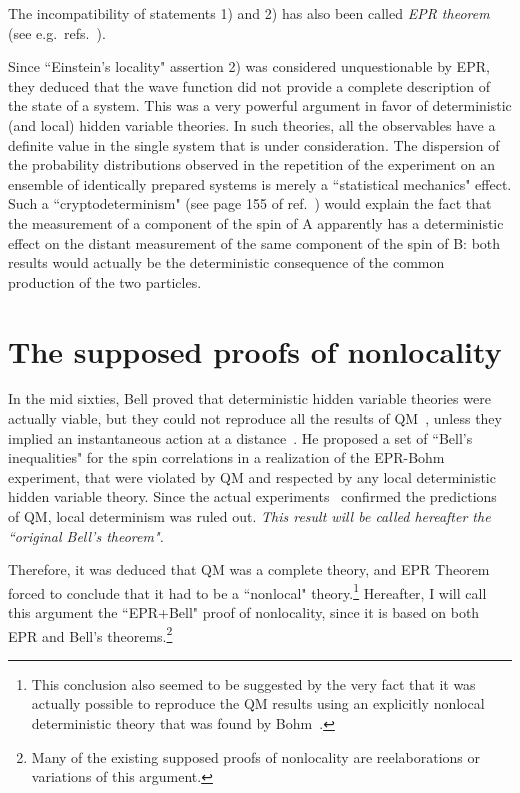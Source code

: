 \documentclass[published]{JHEP3}
\begin{document}
The incompatibility of statements 1) and 2) has also been called
\emph{EPR theorem} (see e.g.\ refs.~\cite{Ballentine70,Peres,Laloe}).

Since ``Einstein's locality" assertion 2) was considered
unquestionable by EPR, they deduced that the wave function did not
provide a complete description of the state of a system. This was a
very powerful argument in favor of deterministic (and local) hidden
variable theories. In such theories, all the observables have a
definite value in the single system that is under consideration. The
dispersion of the probability distributions observed in the repetition
of the experiment on an ensemble of identically prepared systems is
merely a ``statistical mechanics" effect. Such a ``cryptodeterminism"
(see page 155 of ref.~\cite{Peres}) would explain the fact that the
measurement of a component of the spin of A apparently has a
deterministic effect on the distant measurement of the same component
of the spin of B: both results would actually be the deterministic
consequence of the common production of the two particles.


\section{The supposed proofs of nonlocality} 

In the mid sixties, Bell proved that deterministic hidden variable
theories were actually viable, but they could not reproduce all the
results of QM~\cite{Bell64}, unless they implied an instantaneous
action at a distance~\cite{Bell66}. He proposed a set of ``Bell's
inequalities" for the spin correlations in a realization of the
EPR-Bohm experiment, that were violated by QM and respected by any
local deterministic hidden variable theory. Since the actual
experiments~\cite{Aspect} confirmed the predictions of QM, local
determinism was ruled out. \emph{This result will be called hereafter
the ``original Bell's theorem".}

Therefore, it was deduced that QM was a complete theory, and EPR
Theorem forced to conclude that it had to be a ``nonlocal"
theory.\footnote{This conclusion also seemed to be suggested by the
very fact that it was actually possible to reproduce the QM results
using an explicitly nonlocal deterministic theory that was found by
Bohm~\cite{Bohm52}.} Hereafter, I will call this argument the
``EPR+Bell" proof of nonlocality, since it is based on both EPR and
Bell's theorems.\footnote{Many of the existing supposed proofs of
nonlocality are reelaborations or variations of this argument.}
\end{document}
